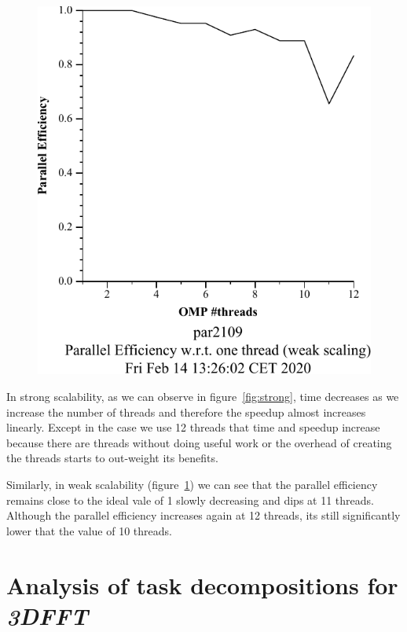 \begin{figure}[H]
\begin{minipage}{.5\textwidth}
  \includegraphics[width=.7\linewidth]{./data/pi/pi_omp-100000000-1-12-3-weak-boada-3.pdf}
  \label{fig:weak}
\end{minipage}
\end{figure}

In strong scalability, as we can observe in figure~\ref{fig:strong}, time decreases as we increase the number of threads and therefore the speedup almost increases linearly. Except in the case we use 12 threads that time and speedup increase because there are threads without doing useful work or the overhead of creating the threads starts to out-weight its benefits.



Similarly, in weak scalability (figure~\ref{fig:weak}) we can see that the parallel efficiency remains close to the ideal vale of 1 slowly decreasing and dips at 11 threads. Although the parallel efficiency increases again at 12 threads,
its still significantly lower that the value of 10 threads.


\section{Analysis of task decompositions for \emph{3DFFT}}%
\label{sec:analysis_of_task_decompositions_for_3dfft}



